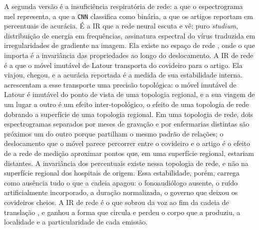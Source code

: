 A segunda versão é a insuficiência respiratória de rede: a que o espectrograma mel representa, a que a \texttt{CNN} classifica como binária, a que os artigos reportam em percentuais de acurácia. É a IR que a rede neural escuta e vê: puro \textit{studium}, distribuição de energia em frequências, assinatura espectral do vírus traduzida em irregularidades de gradiente na imagem. Ela existe no espaço de rede \parencite{MolLaw1994}, onde o que importa é a invariância das propriedades ao longo do deslocamento. A IR de rede é a que o móvel imutável de Latour transporta do covideiro para o artigo. Ela viajou, chegou, e a acurácia reportada é a medida de sua estabilidade interna. \textcite{MolLaw1994} acrescentam a esse transporte uma precisão topológica: o móvel imutável de Latour é imutável do ponto de vista de uma topologia regional, e a sua viagem de um lugar a outro é um efeito inter-topológico, o efeito de uma topologia de rede dobrando a superfície de uma topologia regional. Em uma topologia de rede, dois espectrogramas separados por meses de gravação e por enfermarias distintas são próximos um do outro porque partilham o mesmo padrão de relações; o deslocamento que o móvel parece percorrer entre o covideiro e o artigo é o efeito de a rede de medição aproximar pontos que, em uma superfície regional, estariam distantes. A invariância dos percentuais existe nessa topologia de rede, e não na superfície regional dos hospitais de origem. Essa estabilidade, porém, carrega como ausência tudo o que a cadeia apagou: o fonoaudiólogo ausente, o ruído artificialmente incorporado, a duração normalizada, o governo que deixou os covideiros cheios. A IR de rede é o que sobrou da voz ao fim da cadeia de translação \parencite{Latour2017Esperanca}, e ganhou a forma que circula e perdeu o corpo que a produziu, a localidade e a particularidade de cada emissão.

